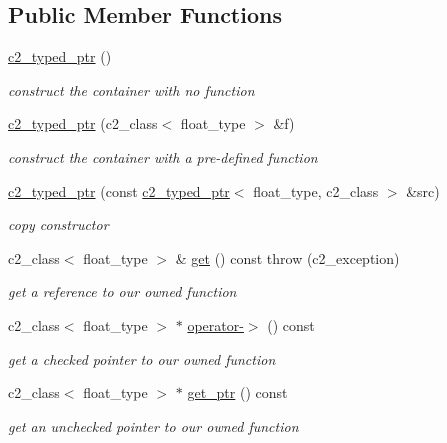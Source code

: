 \subsection*{Public Member Functions}
\begin{DoxyCompactItemize}
\item 
\hyperlink{classc2__typed__ptr_aa50075cc2555fd6a2464a5b775ac19b0}{c2\+\_\+typed\+\_\+ptr} ()
\begin{DoxyCompactList}\small\item\em construct the container with no function \end{DoxyCompactList}\item 
\hyperlink{classc2__typed__ptr_ad18d12500a51383b8cb37462b8db7c8b}{c2\+\_\+typed\+\_\+ptr} (c2\+\_\+class$<$ float\+\_\+type $>$ \&f)
\begin{DoxyCompactList}\small\item\em construct the container with a pre-\/defined function \end{DoxyCompactList}\item 
\hyperlink{classc2__typed__ptr_a7f777e2f429fa05e0ff3e8f821826857}{c2\+\_\+typed\+\_\+ptr} (const \hyperlink{classc2__typed__ptr}{c2\+\_\+typed\+\_\+ptr}$<$ float\+\_\+type, c2\+\_\+class $>$ \&src)
\begin{DoxyCompactList}\small\item\em copy constructor \end{DoxyCompactList}\item 
c2\+\_\+class$<$ float\+\_\+type $>$ \& \hyperlink{classc2__typed__ptr_a5b17f0c0b7f74e51e5e588a44089d8b2}{get} () const   throw (c2\+\_\+exception)
\begin{DoxyCompactList}\small\item\em get a reference to our owned function \end{DoxyCompactList}\item 
c2\+\_\+class$<$ float\+\_\+type $>$ $\ast$ \hyperlink{classc2__typed__ptr_aac8d0a87b319dba4a2758e313500162a}{operator-\/$>$} () const 
\begin{DoxyCompactList}\small\item\em get a checked pointer to our owned function \end{DoxyCompactList}\item 
c2\+\_\+class$<$ float\+\_\+type $>$ $\ast$ \hyperlink{classc2__typed__ptr_a223f362849efffc57b42d576019bac01}{get\+\_\+ptr} () const 
\begin{DoxyCompactList}\small\item\em get an unchecked pointer to our owned function \end{DoxyCompactList}\item 

\end{DoxyCompactItemize}

